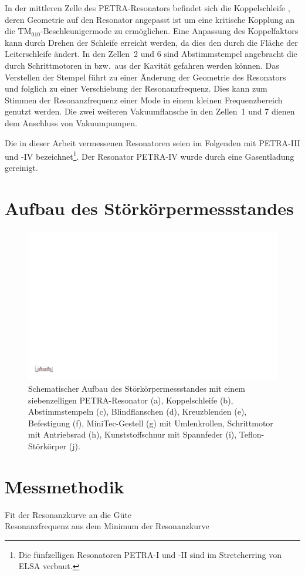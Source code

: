 In der mittleren Zelle des PETRA-Resonators befindet sich die Koppelschleife \cite{desy_schleife}, deren Geometrie auf den Resonator angepasst ist um eine kritische Kopplung an die $\mathrm{TM}_{010}$-Beschleuniger\-mode zu ermöglichen.
Eine Anpassung des Koppelfaktors kann durch Drehen der Schleife erreicht werden, da dies den  durch die Fläche der Leiterschleife ändert.
In den Zellen~2 und 6 sind Abstimmstempel \cite{desy_stempel} angebracht die durch Schrittmotoren in bzw.\ aus der Kavität gefahren werden können.
Das Verstellen der Stempel führt zu einer Änderung der Geometrie des Resonators und folglich zu einer Verschiebung der Resonanzfrequenz.
Dies kann zum Stimmen der Resonanzfrequenz einer Mode in einem kleinen Frequenzbereich genutzt werden.
Die zwei weiteren Vakuumflansche in den Zellen~1 und 7 dienen dem Anschluss von Vakuumpumpen.


Die in dieser Arbeit vermessenen Resonatoren seien im Folgenden mit PETRA-III und -IV bezeichnet\footnote{Die fünfzelligen Resonatoren PETRA-I und -II sind im Stretcherring von ELSA verbaut.}. Der Resonator PETRA-IV wurde durch eine Gasentladung gereinigt.


\section{Aufbau des Störkörpermessstandes}
\begin{figure}
	\centering
	\includegraphics[width=1.0\textheight]{./figs/cavity/messaufbau.pdf}
	\caption{Schematischer Aufbau des Störkörpermessstandes mit einem siebenzelligen PETRA-Resonator (a),  Koppelschleife (b), Abstimmstempeln (c), Blindflanschen (d), Kreuzblenden (e), Befestigung (f), MiniTec-Gestell (g) mit Umlenkrollen, Schrittmotor mit Antriebsrad (h), Kunststoffschnur mit Spannfeder (i), Teflon-Störkörper (j).}
\end{figure}


\section{Messmethodik}
Fit der Resonanzkurve an die Güte\\
Resonanzfrequenz aus dem Minimum der Resonanzkurve
